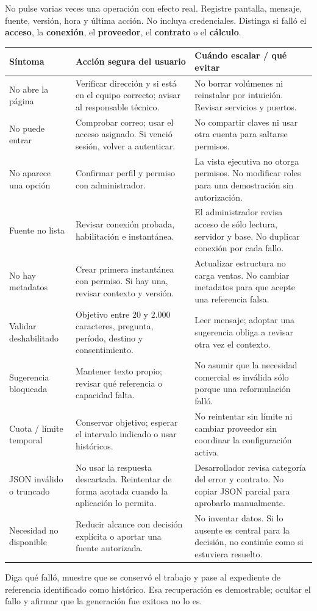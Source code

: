 No pulse varias veces una operación con efecto real. Registre pantalla, mensaje, fuente, versión, hora y última acción. No incluya credenciales. Distinga si falló el \textbf{acceso}, la \textbf{conexión}, el \textbf{proveedor}, el \textbf{contrato} o el \textbf{cálculo}.
{\small
\begin{tabularx}{\linewidth}{@{}p{29mm}YY@{}}
\toprule
\textbf{Síntoma}&\textbf{Acción segura del usuario}&\textbf{Cuándo escalar / qué evitar}\\
\midrule
No abre la página&Verificar dirección y si está en el equipo correcto; avisar al responsable técnico.&No borrar volúmenes ni reinstalar por intuición. Revisar servicios y puertos.\\
No puede entrar&Comprobar correo; usar el acceso asignado. Si venció sesión, volver a autenticar.&No compartir claves ni usar otra cuenta para saltarse permisos.\\
No aparece una opción&Confirmar perfil y permiso con administrador.&La vista ejecutiva no otorga permisos. No modificar roles para una demostración sin autorización.\\
Fuente no lista&Revisar conexión probada, habilitación e instantánea.&El administrador revisa acceso de sólo lectura, servidor y base. No duplicar conexión por cada fallo.\\
No hay metadatos&Crear primera instantánea con permiso. Si hay una, revisar contexto y versión.&Actualizar estructura no carga ventas. No cambiar metadatos para que acepte una referencia falsa.\\
Validar deshabilitado&Objetivo entre 20 y 2.000 caracteres, pregunta, período, destino y consentimiento.&Leer mensaje; adoptar una sugerencia obliga a revisar otra vez el contexto.\\
Sugerencia bloqueada&Mantener texto propio; revisar qué referencia o capacidad falta.&No asumir que la necesidad comercial es inválida sólo porque una reformulación falló.\\
Cuota / límite temporal&Conservar objetivo; esperar el intervalo indicado o usar históricos.&No reintentar sin límite ni cambiar proveedor sin coordinar la configuración activa.\\
JSON inválido o truncado&No usar la respuesta descartada. Reintentar de forma acotada cuando la aplicación lo permita.&Desarrollador revisa categoría del error y contrato. No copiar JSON parcial para aprobarlo manualmente.\\
Necesidad no disponible&Reducir alcance con decisión explícita o aportar una fuente autorizada.&No inventar datos. Si lo ausente es central para la decisión, no continúe como si estuviera resuelto.\\
\bottomrule
\end{tabularx}}
\begin{note}
Diga qué falló, muestre que se conservó el trabajo y pase al expediente de referencia identificado como histórico. Esa recuperación es demostrable; ocultar el fallo y afirmar que la generación fue exitosa no lo es.
\end{note}

